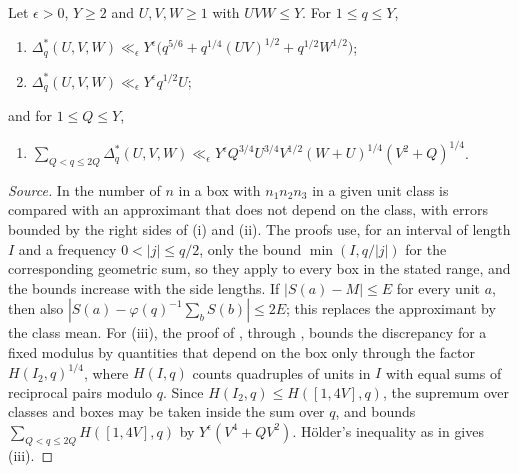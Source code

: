 \documentclass[11pt,colorlinks]{charlie}
\begin{document}
\begin{lemma}\label{lem:HB}
Let $\epsilon>0$, $Y\ge2$ and $U,V,W\ge1$ with $UVW\le Y$. For $1\le q\le Y$,
\begin{enumerate}[label=\textup{(\roman*)}]
\item $\Delta^*_q(U,V,W)\ll_\epsilon Y^\epsilon\big(q^{5/6}+q^{1/4}(UV)^{1/2}+q^{1/2}W^{1/2}\big)$;
\item $\Delta^*_q(U,V,W)\ll_\epsilon Y^\epsilon q^{1/2}U$;
\end{enumerate}
and for $1\le Q\le Y$,
\begin{enumerate}[label=\textup{(\roman*)},resume]
\item $\sum_{Q<q\le2Q}\Delta^*_q(U,V,W)\ll_\epsilon Y^\epsilon Q^{3/4}U^{3/4}V^{1/2}(W+U)^{1/4}(V^2+Q)^{1/4}$.
\end{enumerate}
\end{lemma}
\begin{proof}[Source]
In \cite[Lemmas~5 and 6]{HB} the number of $n$ in a box with $n_1n_2n_3$ in a given unit class is compared with an approximant that does not depend on the class, with errors bounded by the right sides of (i) and (ii). The proofs use, for an interval of length $I$ and a frequency $0<|j|\le q/2$, only the bound $\min(I,q/|j|)$ for the corresponding geometric sum, so they apply to every box in the stated range, and the bounds increase with the side lengths. If $|S(a)-M|\le E$ for every unit $a$, then also $|S(a)-\varphi(q)^{-1}\sum_bS(b)|\le2E$; this replaces the approximant by the class mean. For (iii), the proof of \cite[Lemma~8]{HB}, through \cite[(6.2)--(6.5)]{HB}, bounds the discrepancy for a fixed modulus by quantities that depend on the box only through the factor $H(I_2,q)^{1/4}$, where $H(I,q)$ counts quadruples of units in $I$ with equal sums of reciprocal pairs modulo $q$. Since $H(I_2,q)\le H([1,4V],q)$, the supremum over classes and boxes may be taken inside the sum over $q$, and \cite[(6.14)]{HB} bounds $\sum_{Q<q\le2Q}H([1,4V],q)$ by $Y^\epsilon(V^4+QV^2)$. H\"older's inequality as in \cite[Lemma~8]{HB} gives (iii).
\end{proof}
\end{document}
